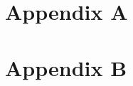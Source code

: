 \documentclass[a4paper,12pt]{book}
\begin{document}


\appendix
\chapter{Appendix A}
\label{app:appenda}


\appendix
\chapter{Appendix B}
\label{app:appendb}

\end{document}
